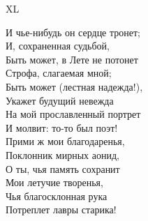 XL

И чье-нибудь он сердце тронет;\\
И, сохраненная судьбой,\\
Быть может, в Лете не потонет\\
Строфа, слагаемая мной;\\
Быть может (лестная надежда!),\\
Укажет будущий невежда\\
На мой прославленный портрет\\
И молвит: то-то был поэт!\\
Прими ж мои благодаренья,\\
Поклонник мирных аонид,\\
О ты, чья память сохранит\\
Мои летучие творенья,\\
Чья благосклонная рука\\
Потреплет лавры старика!\\
